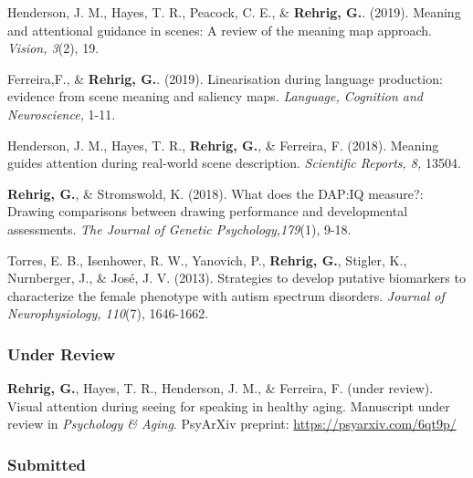 Henderson, J. M., Hayes, T. R., Peacock, C. E., \& \textbf{Rehrig, G.}. (2019). Meaning and attentional guidance in scenes: A review of the meaning map approach. \textit{Vision, 3}(2), 19.


Ferreira,F., \& \textbf{Rehrig, G.}. (2019). Linearisation during language production: evidence from scene meaning and saliency maps. \textit{Language, Cognition and Neuroscience,} 1-11.


Henderson, J. M., Hayes, T. R., \textbf{Rehrig, G.}, \& Ferreira, F. (2018). Meaning guides attention during real-world scene description. \textit{Scientific Reports, 8,} 13504. 


\textbf{Rehrig, G.}, \& Stromswold, K. (2018). What does the DAP:IQ measure?: Drawing comparisons between drawing performance and developmental assessments. \textit{The Journal of Genetic Psychology,179}(1), 9-18.


Torres, E. B., Isenhower, R. W., Yanovich, P., \textbf{Rehrig, G.}, Stigler, K., Nurnberger, J., \& Jos\'e, J. V. (2013). Strategies to develop putative biomarkers to characterize the female phenotype with autism spectrum disorders. \textit{Journal of Neurophysiology, 110}(7), 1646-1662.



\subsubsection*{Under Review}

\textbf{Rehrig, G.}, Hayes, T. R., Henderson, J. M., \& Ferreira, F. (under review). Visual attention during seeing for speaking in healthy aging. Manuscript under review in \textit{Psychology \& Aging}. PsyArXiv preprint: \url{https://psyarxiv.com/6qt9p/}

\subsubsection*{Submitted}

